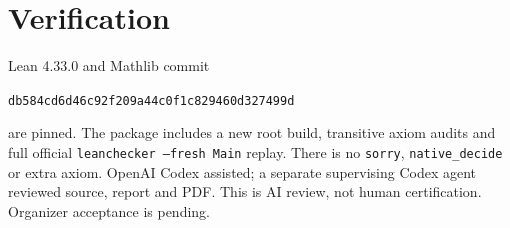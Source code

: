 \documentclass[11pt]{article}
\begin{document}
\section{Verification}
Lean 4.33.0 and Mathlib commit
\begin{center}\small\texttt{db584cd6d46c92f209a44c0f1c829460d327499d}\end{center}
are pinned. The package includes a new root build, transitive axiom
audits and full official \texttt{leanchecker --fresh Main} replay.
There is no \texttt{sorry}, \texttt{native\_decide} or extra axiom.
OpenAI Codex assisted; a separate supervising Codex agent reviewed
source, report and PDF. This is AI review, not human certification.
Organizer acceptance is pending.
\end{document}
